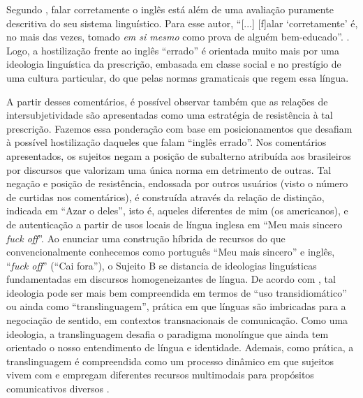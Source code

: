 \documentclass[portuguese]{textolivre}
\begin{document}
Segundo \textcite{stubbs_lingua_2002}, falar corretamente o inglês está além de uma avaliação puramente descritiva do seu sistema linguístico. Para esse autor, “[...] [f]alar ‘corretamente’ é, no mais das vezes, tomado \textit{em si mesmo} como prova de alguém bem-educado”. \cite[p. 105, grifos do autor]{stubbs_lingua_2002}. Logo, a hostilização frente ao inglês “errado” é orientada muito mais por uma ideologia linguística da prescrição, embasada em classe social e no prestígio de uma cultura particular, do que pelas normas gramaticais que regem essa língua.

A partir desses comentários, é possível observar também que as relações de intersubjetividade são apresentadas como uma estratégia de resistência à tal prescrição. Fazemos essa ponderação com base em posicionamentos que desafiam à possível hostilização daqueles que falam “inglês errado”. Nos comentários apresentados, os sujeitos negam a posição de subalterno atribuída aos brasileiros por discursos que valorizam uma única norma em detrimento de outras. Tal negação e posição de resistência, endossada por outros usuários (visto o número de curtidas nos comentários), é construída através da relação de distinção, indicada em “Azar o deles”, isto é, aqueles diferentes de mim (os americanos), e de autenticação a partir de usos locais de língua inglesa em “Meu mais sincero \textit{fuck off}”. 									
Ao enunciar uma construção híbrida de recursos do que convencionalmente conhecemos como português “Meu mais sincero” e inglês, “\textit{fuck off}” (“Cai fora”), o Sujeito B se distancia de ideologias linguísticas fundamentadas em discursos homogeneizantes de língua. De acordo com \textcite{moita_lopes_ideologia_2013}, tal ideologia pode ser mais bem compreendida em termos de “uso transidiomático” ou ainda como “translinguagem”, prática em que línguas são imbricadas para a negociação de sentido, em contextos transnacionais de comunicação. Como uma ideologia, a translinguagem desafia o paradigma monolíngue \cite{canagarajah_translingual_2013,zolin-vesz_gusta_2016} que ainda tem orientado o nosso entendimento de língua e identidade. Ademais, como prática, a translinguagem é compreendida como um processo dinâmico em que sujeitos vivem com e empregam diferentes recursos multimodais para propósitos comunicativos diversos \cite{otheguy_clarifying_2015}. 	
\end{document}
